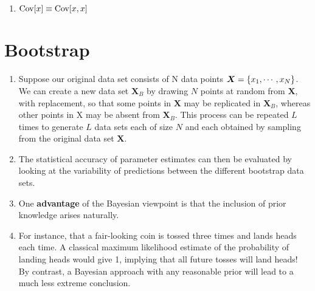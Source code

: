 \begin{multicols}{2}
\begin{enumerate}[series=rvrules]
    \item $ \text{Cov}[x] \equiv \text{Cov}[x,x] $
    \hfill \cite{ml/book/Pattern-Recognition-And-Machine-Learning/Christopher-M-Bishop}
\end{enumerate}
\end{multicols}






\section{Bootstrap}


\begin{enumerate}
    \item Suppose our original data set consists of N data points $\bm{X} = \left\{x_1, \cdots , x_N \right\}$.
    We can create a new data set $\bm{X}_B$ by drawing $N$ points at random from $\bm{X}$, with replacement, so that some points in $\bm{X}$ may be replicated in $\bm{X}_B$, whereas other points in X may be absent from $\bm{X}_B$.
    This process can be repeated $L$ times to generate $L$ data sets each of size $N$ and each obtained by sampling from the original data set $\bm{X}$.
    \hfill \cite{ml/book/Pattern-Recognition-And-Machine-Learning/Christopher-M-Bishop}

    \item The statistical accuracy of parameter estimates can then be evaluated by looking at the variability of predictions between the different bootstrap data sets.
    \hfill \cite{ml/book/Pattern-Recognition-And-Machine-Learning/Christopher-M-Bishop}

    \item One \textbf{advantage} of the Bayesian viewpoint is that the inclusion of prior knowledge arises naturally.
    \hfill \cite{ml/book/Pattern-Recognition-And-Machine-Learning/Christopher-M-Bishop}

    \item For instance, that a fair-looking coin is tossed three times and lands heads each time.
    A classical maximum likelihood estimate of the probability of landing heads would give 1, implying that all future tosses will land heads!
    By contrast, a Bayesian approach with any reasonable prior will lead to a much less extreme conclusion.
    \hfill \cite{ml/book/Pattern-Recognition-And-Machine-Learning/Christopher-M-Bishop}


\end{enumerate}











